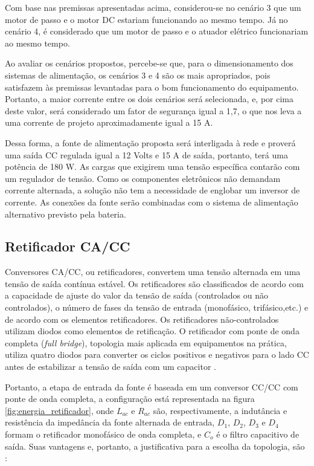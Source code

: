 Com base nas premissas apresentadas acima, considerou-se no cenário 3 que um motor de passo e o motor DC estariam funcionando ao mesmo tempo. Já no cenário 4, é considerado que um motor de passo e o atuador elétrico funcionariam ao mesmo tempo.

Ao avaliar os cenários propostos, percebe-se que, para o dimensionamento dos sistemas de alimentação, os cenários 3 e 4 são os mais apropriados, pois satisfazem às premissas levantadas para o bom funcionamento do equipamento. Portanto, a maior corrente entre os dois cenários será selecionada, e, por cima deste valor, será considerado um fator de segurança igual a 1,7, o que nos leva a uma corrente de projeto aproximadamente igual a 15 A.

Dessa forma, a fonte de alimentação proposta será interligada à rede e proverá uma saída CC regulada igual a 12 Volts e 15 A de saída, portanto, terá uma potência de 180 W. As cargas que exigirem uma tensão específica contarão com um regulador de tensão. Como os componentes eletrônicos não demandam corrente alternada, a solução não tem a necessidade de englobar um inversor de corrente. As conexões da fonte serão combinadas com o sistema de alimentação alternativo previsto pela bateria. 

\subsection{Retificador CA/CC}


Conversores CA/CC, ou retificadores, convertem uma tensão alternada em uma tensão de saída contínua estável. Os retificadores são classificados de acordo com a capacidade de ajuste do valor da tensão de saída (controlados ou não controlados), o número de fases da tensão de entrada (monofásico, trifásico,etc.) e de acordo com os elementos retificadores. Os retificadores não-controlados utilizam diodos como elementos de retificação. O retificador com ponte de onda completa (\textit{full bridge}), topologia mais aplicada em equipamentos na prática, utiliza quatro diodos para converter os ciclos positivos e negativos para o lado CC antes de estabilizar a tensão de saída com um capacitor \cite{Conversores,Conversores2}. 

Portanto, a etapa de entrada da fonte é baseada em um conversor CC/CC com ponte de onda completa, a configuração está representada na figura \ref{fig:energia_retificador}, onde $L_{ac}$ e $R_{ac}$ são, respectivamente, a indutância e resistência da impedância da fonte alternada de entrada, $D_{1}$, $D_{2}$, $D_{3}$ e $D_{4}$ formam o retificador monofásico de onda completa, e $C_{o}$ é o filtro capacitivo de saída. Suas vantagens e, portanto, a justificativa para a escolha da topologia, são \cite{retificador}:

